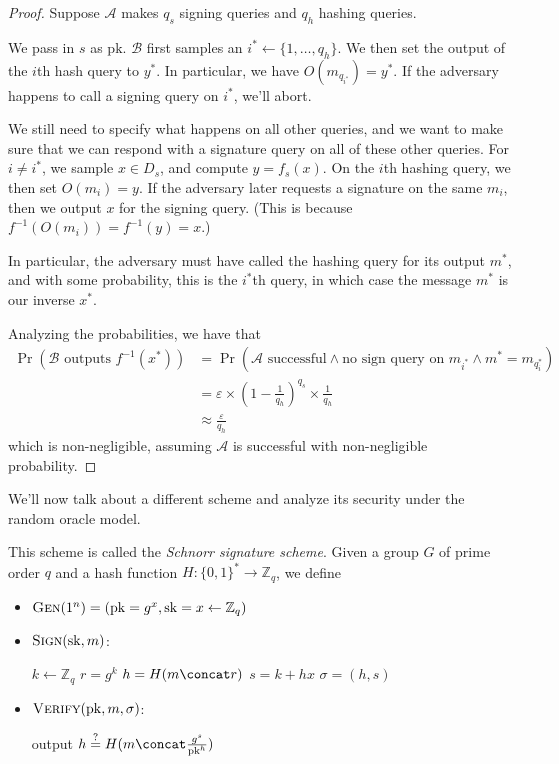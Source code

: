 \begin{proof}
    Suppose $\mathcal{A}$ makes $q_s$ signing queries and $q_h$ hashing queries.

    We pass in $s$ as $\mathrm{pk}$. $\mathcal{B}$ first samples an $i^* \gets \{1, \ldots, q_h\}$. We then set the output of the $i$th hash query to $y^*$. In particular, we have $O(m_{q_{i^*}}) = y^*$. If the adversary happens to call a signing query on $i^*$, we'll abort.

    We still need to specify what happens on all other queries, and we want to make sure that we can respond with a signature query on all of these other queries. For $i \ne i^*$, we sample $x \in D_s$, and compute $y = f_s(x)$. On the $i$th hashing query, we then set $O(m_i) = y$. If the adversary later requests a signature on the same $m_i$, then we output $x$ for the signing query. (This is because $f^{-1}(O(m_i)) = f^{-1}(y) = x$.)

    In particular, the adversary must have called the hashing query for its output $m^*$, and with some probability, this is the $i^*$th query, in which case the message $m^*$ is our inverse $x^*$.

    Analyzing the probabilities, we have that
    \begin{align*}
        \Pr(\text{$\mathcal{B}$ outputs $f^{-1}(x^*)$})
         & = \Pr(\text{$\mathcal{A}$ successful} \land \text{no sign query on $m_{i^*}$} \land m^* = m_{q_i^*}) \\
         & = \varepsilon \times \left(1 - \frac{1}{q_h}\right)^{q_s} \times \frac{1}{q_h}                       \\
         & \approx \frac{\varepsilon}{q_h}
    \end{align*}
    which is non-negligible, assuming $\mathcal{A}$ is successful with non-negligible probability.
\end{proof}

We'll now talk about a different scheme and analyze its security under the random oracle model.

This scheme is called the \emph{Schnorr signature scheme}. Given a group $G$ of prime order $q$ and a hash function $H : \{0, 1\}^* \to \mathbb{Z}_q$, we define
\begin{itemize}
    \item $\textsc{Gen}(1^n) = (\mathrm{pk} = g^x, \mathrm{sk} = x \gets \mathbb{Z}_q)$
    \item $\textsc{Sign}(\mathrm{sk}, m)$:
          \begin{algorithmic}
              \State $k \gets \mathbb{Z}_q$
              \State $r = g^k$
              \State $h = H(m \concat r)$
              \State $s = k + hx$
              \State $\sigma = (h, s)$
          \end{algorithmic}

    \item $\textsc{Verify}(\mathrm{pk}, m, \sigma)$:
          \begin{algorithmic}
              \State output $h \overset{?}{=} H(m \concat \frac{g^s}{\mathrm{pk}^h})$
          \end{algorithmic}
\end{itemize}

